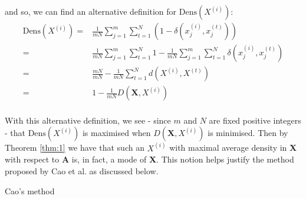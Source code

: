 and so, we can find an alternative definition for \(\text{Dens}(X^{(i)})\):
\begin{equation}
\begin{aligned}
    \text{Dens}(X^{(i)}) = {} & {} \frac{1}{mN} \sum_{j=1}^m \sum_{t=1}^N 
                         (1 - \delta(x_j^{(i)}, x_j^{(t)}))
    \\
			             = {} & {} \frac{1}{mN} \sum_{j=1}^m \sum_{t=1}^N 1 - 
                         \frac{1}{mN} \sum_{j=1}^m \sum_{t=1}^N 
                         \delta(x_j^{(i)}, x_j^{(t)})
    \\
                         = {} & {} \frac{mN}{mN} - \frac{1}{mN} \sum_{t=1}^N 
                         d(X^{(i)}, X^{(t)})
    \\
			             = {} & {} 1 - \frac{1}{mN} D(\textbf{X}, X^{(i)})
\end{aligned}
\end{equation}\\

With this alternative definition, we see - since \(m\) and \(N\) are fixed 
positive integers - that \(\text{Dens}(X^{(i)})\) is maximised when 
\(D(\textbf{X}, X^{(i)})\) is minimised. Then by Theorem \ref{thm:1} we have
that such an \(X^{(i)}\) with maximal average density in \textbf{X} with respect
to \textbf{A} is, in fact, a mode of \textbf{X}. This notion helps justify the 
method proposed by Cao et al. as discussed below.\\

\begin{algorithm}[H]
\caption{Cao's method}\label{alg:cao}
	\begin{algorithmic}[0]
        \State{\(\bar{\mu} \gets \emptyset\)}
		\EndFor
		\EndWhile
	\end{algorithmic}
\end{algorithm}

